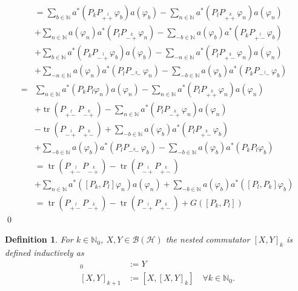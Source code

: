 \documentclass[b5paper,draft,openbib,12pt]{memoir}
\newtheorem{Def}{Definition}
\DeclareMathOperator{\tr}{tr}
\begin{document}
\begin{align*}
&=\sum_{b\in\mathbb{N}} a^*\left(P_k P_{\stackrel{l}{++}}\varphi_b\right)a(\varphi_b) - \sum_{n\in\mathbb{N}}a^*\left(P_l P_{\stackrel{k}{++}}\varphi_n\right)a(\varphi_n)\\
&+\sum_{n\in\mathbb{N}}a(\varphi_n)a^*\left(P_l P_{\stackrel{k}{-+}}\varphi_n\right) - \sum_{-b\in\mathbb{N}} a(\varphi_b)a^*\left(P_k P_{\stackrel{l}{+-}}\varphi_b\right)\\
&+\sum_{b\in\mathbb{N}}a^*\left(P_k P_{\stackrel{l}{-+}}\varphi_b\right)a(\varphi_b)-\sum_{-n\in\mathbb{N}}a^*\left(P_l P_{\stackrel{k}{+-}}\varphi_n\right) a(\varphi_n)\\
&+\sum_{-n\in\mathbb{N}}a(\varphi_n)a^*\left(P_l P_{\stackrel{k}{--}}\varphi_n\right) - \sum_{-b \in \mathbb{N}} a(\varphi_b)a^*\left(P_k P_{\stackrel{l}{--}}\varphi_b\right)\\
=&\sum_{n\in\mathbb{N}} a^*\left(P_k P_l \varphi_n \right) a(\varphi_n) - \sum_{n\in\mathbb{N}} a^*\left(P_l P_{\stackrel{k}{++}} \varphi_n \right) a(\varphi_n)\\
&+\tr \left( P_{\stackrel{l}{+-}} P_{\stackrel{k}{-+}}\right) - \sum_{n\in\mathbb{N}} a^*\left( P_l P_{\stackrel{k}{-+}} \varphi_n\right)a(\varphi_n)\\
&-\tr \left( P_{\stackrel{l}{-+}} P_{\stackrel{k}{+-}}\right) + \sum_{-b\in\mathbb{N}} a(\varphi_b) a^*\left(P_l P_{\stackrel{k}{+-}} \varphi_b\right)\\
&+\sum_{-b\in\mathbb{N}} a(\varphi_b) a^*\left( P_l P_{\stackrel{k}{--}}\varphi_b\right) - \sum_{-b\in\mathbb{N}} a(\varphi_b) a^*\left( P_k P_l \varphi_b\right)\\
&=\tr \left( P_{\stackrel{l}{+-}} P_{\stackrel{k}{-+}}\right)
-\tr \left( P_{\stackrel{l}{-+}} P_{\stackrel{k}{+-}}\right)\\
&+\sum_{n\in\mathbb{N}} a^*\left(\left[P_k ,P_l\right] \varphi_n \right) a(\varphi_n)
+\sum_{-b\in\mathbb{N}} a(\varphi_b)a^*\left(\left[P_l ,P_k\right] \varphi_b \right) \\
&=\tr \left( P_{\stackrel{l}{+-}} P_{\stackrel{k}{-+}}\right)
-\tr \left( P_{\stackrel{l}{-+}} P_{\stackrel{k}{+-}}\right)
+G\left(\left[P_k,P_l\right]\right)
\end{align*}
\qed

\begin{Def}
For \(k\in\mathbb{N}_0\), \(X,Y\in \mathcal{B}(\mathcal{H})\) the nested commutator \([X,Y]_k\) is defined inductively as
\begin{align*}
[X,Y]_0&:= Y\\
[X,Y]_{k+1}&:=[X,[X,Y]_{k}] \quad \forall k\in\mathbb{N}_0.
\end{align*}
\end{Def}
\end{document}
